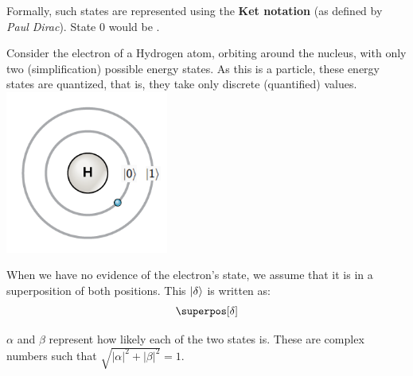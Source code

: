 \documentclass[aspectratio=43]{beamer}
\begin{document}
\begin{frame}{\qsp}
    \begin{cardTiny}
        Formally, such states are represented using the \textbf{Ket notation} (as defined by \textit{Paul Dirac}). State 0 would be . 
    \end{cardTiny}
    \begin{cardTiny}
        \begin{multicols}{2}
    		Consider the electron of a Hydrogen atom, orbiting around the nucleus, with only two (simplification) possible energy states. As this is a \q particle, these energy states are quantized, that is, they take only discrete (quantified) values. 
    		\centering
    		\includegraphics[width=0.4\textwidth]{hydrogen}
	    \end{multicols}
    \end{cardTiny}
\end{frame}

\begin{frame}{\qsp}
    \begin{card}
        When we have no evidence of the electron's state, we assume that it is in a superposition of both positions. This \qsp $\ket{\delta}$ is written as:
	\begin{equation*}
	    \superpos[\delta]
	\end{equation*}
    \end{card}
    \begin{cardTiny}
        $\alpha$ and $\beta$ represent how likely each of the two states is. These are complex numbers such that $\sqrt{|\alpha|^2 + |\beta|^2} = 1$. 
    \end{cardTiny}
\end{frame}
\end{document}
